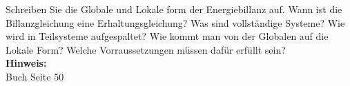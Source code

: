 \begin{question}[section=2,subsection=23,name={Energiebillanz in der Feldphysik},difficulty=5,type=mdl,tags={}]
	Schreiben Sie die Globale und Lokale form der Energiebillanz auf. Wann ist die Billanzgleichung eine Erhaltungsgleichung? Was sind vollständige Systeme? Wie wird in Teilsysteme aufgespaltet? Wie kommt man von der Globalen auf die Lokale Form? Welche Vorraussetzungen müssen dafür erfüllt sein? 
	\\ \textbf{Hinweis:}\\
	Buch Seite 50
\end{question}
\begin{solution}
	
\end{solution}